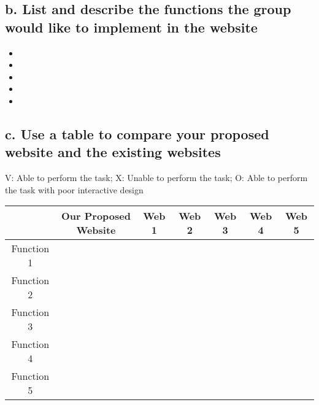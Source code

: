 \documentclass{article}
\begin{document}
\subsection{b. List and describe the functions the group would like to implement in the website}

\begin{itemize}
    \item %
    
    \item %
    
    \item %
    
    \item %
    
    \item %
    
\end{itemize}


\subsection{c. Use a table to compare your proposed website and the existing websites}

V: Able to perform the task; X: Unable to perform the task; O: Able to perform the task with poor interactive design

\begin{table}[h!]
    \centering
    \begin{tabular}{|c|c|c|c|c|c|c|}
    \hline
                   &  Our Proposed Website & Web 1 & Web 2 & Web 3 & Web 4 & Web 5 \\
    \hline
    Function 1    &            &       &       &       &       &              \\
    \hline
    Function 2    &            &       &       &       &       &              \\
    \hline
    Function 3    &            &       &       &       &       &             \\
    \hline
    Function 4    &            &       &       &       &       &              \\
    \hline
    Function 5    &            &       &       &       &       &              \\ 
    \hline
    \end{tabular}
\end{table}
\end{document}
